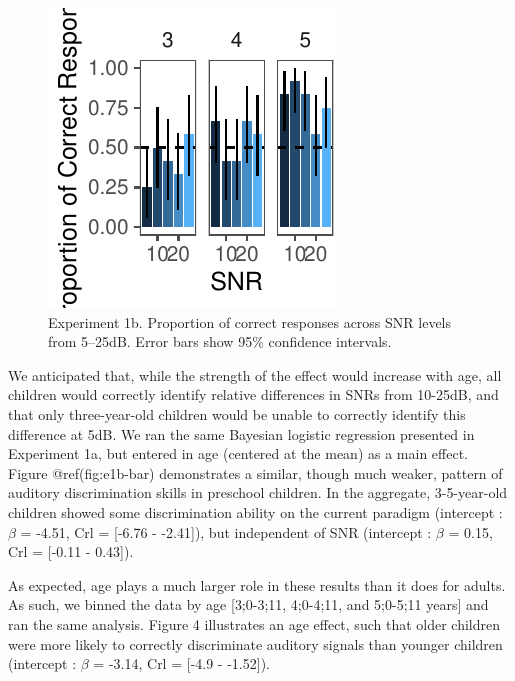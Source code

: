 \documentclass[10pt, letterpaper]{article}
\newenvironment{CodeChunk}{}{}
\begin{document}
\begin{CodeChunk}
\begin{figure}[H]

{\centering \includegraphics{figs/e1b-bar-1} 

}

\caption[Experiment 1b]{Experiment 1b. Proportion of correct responses across SNR levels from 5--25dB. Error bars show 95\% confidence intervals.}\label{fig:e1b-bar}
\end{figure}
\end{CodeChunk}

We anticipated that, while the strength of the effect would increase
with age, all children would correctly identify relative differences in
SNRs from 10-25dB, and that only three-year-old children would be unable
to correctly identify this difference at 5dB. We ran the same Bayesian
logistic regression presented in Experiment 1a, but entered in age
(centered at the mean) as a main effect. Figure @ref(fig:e1b-bar)
demonstrates a similar, though much weaker, pattern of auditory
discrimination skills in preschool children. In the aggregate,
3-5-year-old children showed some discrimination ability on the current
paradigm (intercept : \(\beta\) = -4.51, Crl = {[}-6.76 - -2.41{]}), but
independent of SNR (intercept : \(\beta\) = 0.15, Crl = {[}-0.11 -
0.43{]}).

As expected, age plays a much larger role in these results than it does
for adults. As such, we binned the data by age {[}3;0-3;11, 4;0-4;11,
and 5;0-5;11 years{]} and ran the same analysis. Figure 4 illustrates an
age effect, such that older children were more likely to correctly
discriminate auditory signals than younger children (intercept :
\(\beta\) = -3.14, Crl = {[}-4.9 - -1.52{]}).
\end{document}
